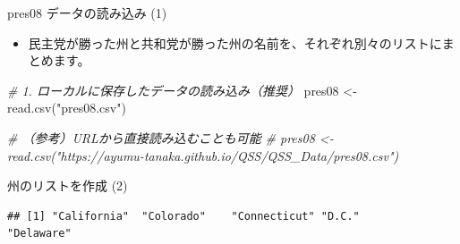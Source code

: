 \documentclass[
  ignorenonframetext,
]{beamer}
\newenvironment{Shaded}{\begin{snugshade}}{\end{snugshade}}
\newcommand{\AttributeTok}[1]{\textcolor[rgb]{0.77,0.63,0.00}{#1}}
\newcommand{\CommentTok}[1]{\textcolor[rgb]{0.56,0.35,0.01}{\textit{#1}}}
\newcommand{\DecValTok}[1]{\textcolor[rgb]{0.00,0.00,0.81}{#1}}
\newcommand{\FunctionTok}[1]{\textcolor[rgb]{0.00,0.00,0.00}{#1}}
\newcommand{\NormalTok}[1]{#1}
\newcommand{\OtherTok}[1]{\textcolor[rgb]{0.56,0.35,0.01}{#1}}
\newcommand{\SpecialCharTok}[1]{\textcolor[rgb]{0.00,0.00,0.00}{#1}}
\newcommand{\StringTok}[1]{\textcolor[rgb]{0.31,0.60,0.02}{#1}}
\providecommand{\tightlist}{%
  \setlength{\itemsep}{0pt}\setlength{\parskip}{0pt}}
\begin{document}
\begin{frame}[fragile]{pres08 データの読み込み (1)}
\protect\hypertarget{pres08-ux30c7ux30fcux30bfux306eux8aadux307fux8fbcux307f-1}{}
\begin{itemize}
\tightlist
\item
  民主党が勝った州と共和党が勝った州の名前を、それぞれ別々のリストにまとめます。
\end{itemize}

\scriptsize

\begin{Shaded}
\begin{Highlighting}[]
\CommentTok{\# 1. ローカルに保存したデータの読み込み（推奨）}
\NormalTok{pres08 }\OtherTok{\textless{}{-}} \FunctionTok{read.csv}\NormalTok{(}\StringTok{"pres08.csv"}\NormalTok{)}

\CommentTok{\# （参考）URLから直接読み込むことも可能}
\CommentTok{\# pres08 \textless{}{-} read.csv("https://ayumu{-}tanaka.github.io/QSS/QSS\_Data/pres08.csv")}
\end{Highlighting}
\end{Shaded}

\normalsize
\end{frame}

\begin{frame}[fragile]{州のリストを作成 (2)}
\protect\hypertarget{ux5ddeux306eux30eaux30b9ux30c8ux3092ux4f5cux6210-2}{}
\scriptsize

\begin{Shaded}
\end{Shaded}

\begin{verbatim}
## [1] "California"  "Colorado"    "Connecticut" "D.C."        "Delaware"
\end{verbatim}

\normalsize
\end{frame}
\end{document}
